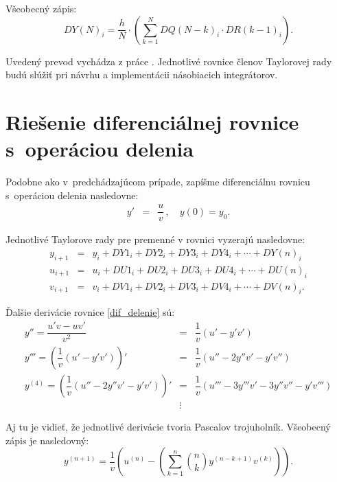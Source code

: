 Všeobecný zápis:
\begin{equation}
DY(N)_{i} = \dfrac{h}{N} \cdot \left( \sum_{k=1}^N DQ(N-k)_{i} \cdot DR(k-1)_{i} \right) . \label{suma_mul}
\end{equation}

Uvedený prevod vychádza z práce \cite{ZavadaBP}. Jednotlivé rovnice členov Taylorovej rady budú slúžiť pri návrhu a implementácii násobiacich integrátorov.


\section{Riešenie diferenciálnej rovnice s~operáciou delenia}
Podobne ako v~predchádzajúcom prípade, zapíšme diferenciálnu rovnicu s~operáciou delenia nasledovne:
\begin{eqnarray}
y' & = & \dfrac{u}{v} \, , \quad y(0) = y_{0} . \label{dif_delenie}
\end{eqnarray}



Jednotlivé Taylorove rady pre premenné v rovnici vyzerajú nasledovne:
\begin{eqnarray}
y_{i + 1} & = & y_{i} + DY1_{i} + DY2_{i} + DY3_{i} + DY4_{i} + \cdots + DY(n)_{i}\\
u_{i+1} & = & u_i + DU1_i + DU2_i + DU3_i + DU4_i + \cdots + DU(n)_i\\
v_{i+1} & = & v_i + DV1_i + DV2_i + DV3_i + DV4_i + \cdots + DV(n)_i .
\end{eqnarray}



Ďalšie derivácie rovnice \eqref{dif_delenie} sú:
\begin{eqnarray}
y'' = \dfrac{u'v - uv'}{v^{2}} & = & \dfrac{1}{v} (u' - y'v') \label{derivacie_delenie} \\
y''' = \left( \dfrac{1}{v} (u' - y'v') \right)' & = & \dfrac{1}{v} (u'' - 2y''v' - y'v'') \nonumber \\
y^{(4)} = \left( \dfrac{1}{v} (u'' - 2y''v' - y'v') \right)' & = & \dfrac{1}{v} (u''' - 3y'''v' - 3y''v'' - y'v''') \nonumber \\
 & \vdots \nonumber &
\end{eqnarray}

Aj tu je vidieť, že jednotlivé derivácie tvoria Pascalov trojuholník. Všeobecný zápis je nasledovný:
\begin{equation}
y^{(n+1)} = \dfrac{1}{v} \left( u^{(n)} - \left( \sum_{k=1}^n \binom{n}{k} y^{(n-k+1)} v^{(k)} \right) \right) . \nonumber
\end{equation}
\bigskip


